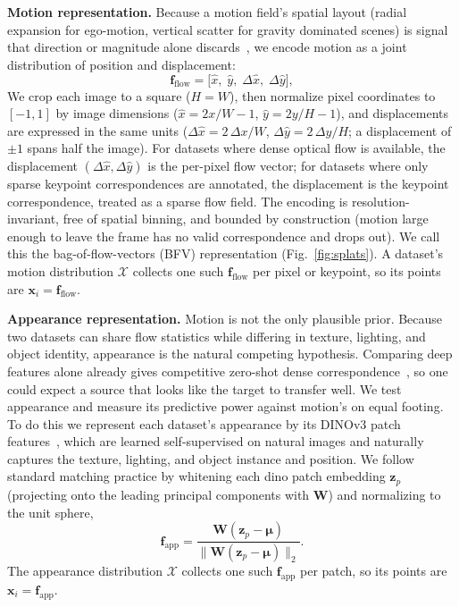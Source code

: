 \noindent\textbf{Motion representation.}
Because a motion field's spatial layout (radial expansion for ego-motion, vertical scatter for gravity dominated scenes) is signal that direction or magnitude alone discards~\cite{roth_opt_flow}, we encode motion as a joint distribution of position and displacement:
\begin{equation}
\mathbf{f}_{\text{flow}} = \bigl[\hat{x},\;\hat{y},\;\Delta\hat{x},\;\Delta\hat{y}\bigr],
\label{eq:bfv}
\end{equation}
We crop each image to a square ($H{=}W$), then normalize pixel coordinates to
$[-1,1]$ by image dimensions ($\hat{x} = 2x/W - 1$, $\hat{y} = 2y/H - 1$), and
displacements are expressed in the same units ($\Delta\hat{x} = 2\,\Delta x/W$,
$\Delta\hat{y} = 2\,\Delta y/H$; a displacement of $\pm1$ spans half the image).
For datasets where dense optical flow is available, the displacement
$(\Delta\hat{x},\Delta\hat{y})$ is the per-pixel flow vector; for datasets where only sparse
keypoint correspondences are annotated, the displacement is the keypoint
correspondence, treated as a sparse flow field. The encoding is resolution-invariant, free of spatial binning, and bounded by
construction (motion large enough to leave the frame has no valid correspondence and
drops out).  We call this the bag-of-flow-vectors (BFV) representation (Fig.~\ref{fig:splats}). A dataset's motion distribution $\mathcal{X}$ collects one such $\mathbf{f}_{\text{flow}}$ per pixel or keypoint, so its points are $\mathbf{x}_i = \mathbf{f}_{\text{flow}}$.

\noindent\textbf{Appearance representation.}
Motion is not the only plausible prior. Because two datasets can share flow statistics while differing in texture,
lighting, and object identity, appearance is the natural competing
hypothesis. Comparing deep features alone already gives competitive
zero-shot dense correspondence~\cite{sd_dino_tale_of_two_features}, so one could expect
a source that looks like the target to transfer well. We test
appearance and measure its predictive power against motion's on equal
footing. To do this we represent each dataset's appearance by its DINOv3 patch
features~\cite{simeoni2025dinov3}, which are learned self-supervised on natural images and naturally captures the texture, lighting, and object instance and position. We follow standard matching practice by whitening each dino patch embedding $\mathbf{z}_p$ (projecting
onto the leading principal components with $\mathbf{W}$) and normalizing to the unit sphere,
\begin{equation}
\mathbf{f}_{\text{app}} = \frac{\mathbf{W}(\mathbf{z}_p - \boldsymbol{\mu})}
{\lVert \mathbf{W}(\mathbf{z}_p - \boldsymbol{\mu}) \rVert_2}.
\label{eq:app}
\end{equation}
The appearance distribution $\mathcal{X}$ collects one such $\mathbf{f}_{\text{app}}$ per patch, so its points are $\mathbf{x}_i = \mathbf{f}_{\text{app}}$.


